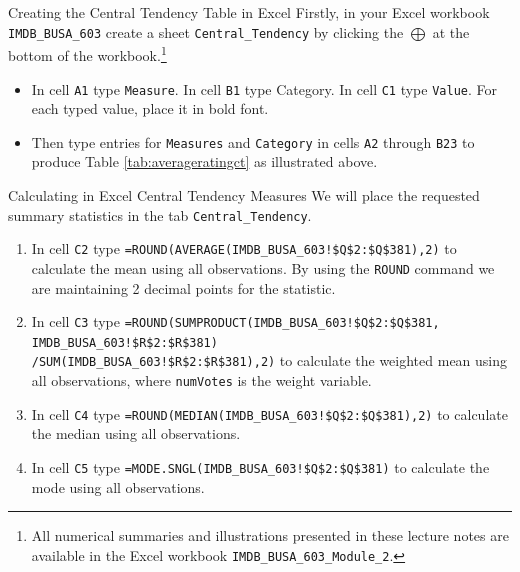 \documentclass[pdf]{beamer}
\theoremstyle{remark}
\theoremstyle{definition}
\begin{document}
\begin{frame}[t]{Creating the Central Tendency Table in Excel}
  Firstly, in your Excel workbook \texttt{IMDB\_BUSA\_603} create a sheet \texttt{Central\_Tendency} by clicking the 
\texttt{$\bigoplus$} at the bottom of the workbook.\footnote{All numerical summaries and illustrations presented in these lecture notes are available in the Excel workbook \texttt{IMDB\_BUSA\_603\_Module\_2}.}  \\
\vspace{1.5ex}
\begin{itemize}
\item In cell \texttt{A1} type \texttt{Measure}. In cell \texttt{B1} type {Category}.  In cell \texttt{C1} type \texttt{Value}.  For each typed value, place it in bold font. 
\item Then type entries for \texttt{Measures} and \texttt{Category} in cells \texttt{A2} through \texttt{B23} to produce Table \ref{tab:averageratingct} as illustrated above.
\end{itemize} 
\end{frame}

\begin{frame}[t]{Calculating in Excel Central Tendency Measures}
\small
 We will place the requested summary statistics in the tab \texttt{Central\_Tendency}.\\  
\begin{enumerate}
\item In cell \texttt{C2} type \texttt{=ROUND(AVERAGE(IMDB\_BUSA\_603!\$Q\$2:\$Q\$381),2)} to calculate the mean using all observations. By using the \texttt{ROUND} command we are maintaining 2 decimal points for the statistic.
\item In cell \texttt{C3} type \texttt{=ROUND(SUMPRODUCT(IMDB\_BUSA\_603!\$Q\$2:\$Q\$381, \\ IMDB\_BUSA\_603!\$R\$2:\$R\$381) \\ /SUM(IMDB\_BUSA\_603!\$R\$2:\$R\$381),2)} to calculate the weighted mean using all observations, where \texttt{numVotes} is the weight variable.  
\item In cell \texttt{C4} type \texttt{=ROUND(MEDIAN(IMDB\_BUSA\_603!\$Q\$2:\$Q\$381),2)} to calculate the median using all observations.
\item In cell \texttt{C5} type \texttt{=MODE.SNGL(IMDB\_BUSA\_603!\$Q\$2:\$Q\$381)} to calculate the mode using all observations.
\end{enumerate}
\end{frame}
\end{document}
